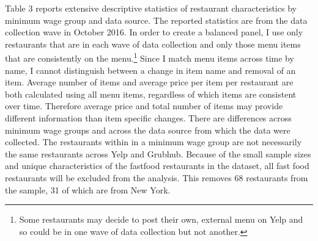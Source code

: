 \documentclass[11pt]{article}
\begin{document}
Table 3 reports extensive descriptive statistics of restaurant characteristics by minimum wage group and data source. The reported statistics are from the data collection wave in October 2016. In order to create a balanced panel, I use only restaurants that are in each wave of data collection and only those menu items that are consistently on the menu.\footnote{Some restaurants may decide to post their own, external menu on Yelp and so could be in one wave of data collection but not another.} Since I match menu items across time by name, I cannot distinguish between a change in item name and removal of an item. Average number of items and average price per item per restaurant are both calculated using all menu items, regardless of which items are consistent over time. Therefore average price and total number of items may provide different information than item specific changes. There are differences across minimum wage groups and across the data source from which the data were collected. The restaurants within in a minimum wage group are not necessarily the same restaurants across Yelp and Grubhub. %
Because of the small sample sizes and unique characteristics of the fastfood restaurants in the dataset, all fast food restaurants will be excluded from the analysis. This removes 68 restaurants from the sample, 31 of which are from New York.





\end{document}
